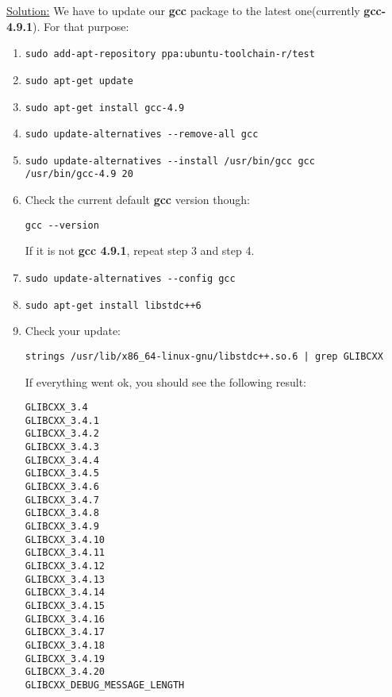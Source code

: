 \underline{Solution:} We have to update our \textbf{gcc} package to the latest one(currently \textbf{gcc-4.9.1}). For that purpose:
\begin{enumerate}
\item \begin{verbatim}sudo add-apt-repository ppa:ubuntu-toolchain-r/test\end{verbatim}
\item \begin{verbatim}sudo apt-get update\end{verbatim}
\item \begin{verbatim}sudo apt-get install gcc-4.9\end{verbatim}
\item \begin{verbatim}sudo update-alternatives --remove-all gcc\end{verbatim}\item \begin{verbatim}sudo update-alternatives --install /usr/bin/gcc gcc 
/usr/bin/gcc-4.9 20\end{verbatim}
\item Check the current default \textbf{gcc} version though:
\begin{verbatim}gcc --version\end{verbatim}
If it is not \textbf{gcc 4.9.1}, repeat step 3 and step 4.
\item \begin{verbatim}sudo update-alternatives --config gcc\end{verbatim}
\item \begin{verbatim}sudo apt-get install libstdc++6\end{verbatim}
\item Check your update:
\begin{verbatim}strings /usr/lib/x86_64-linux-gnu/libstdc++.so.6 | grep GLIBCXX\end{verbatim}
If everything went ok, you should see the following result:
\begin{verbatim}
GLIBCXX_3.4
GLIBCXX_3.4.1
GLIBCXX_3.4.2
GLIBCXX_3.4.3
GLIBCXX_3.4.4
GLIBCXX_3.4.5
GLIBCXX_3.4.6
GLIBCXX_3.4.7
GLIBCXX_3.4.8
GLIBCXX_3.4.9
GLIBCXX_3.4.10
GLIBCXX_3.4.11
GLIBCXX_3.4.12
GLIBCXX_3.4.13
GLIBCXX_3.4.14
GLIBCXX_3.4.15
GLIBCXX_3.4.16
GLIBCXX_3.4.17
GLIBCXX_3.4.18
GLIBCXX_3.4.19
GLIBCXX_3.4.20
GLIBCXX_DEBUG_MESSAGE_LENGTH
\end{verbatim}
\end{enumerate}

